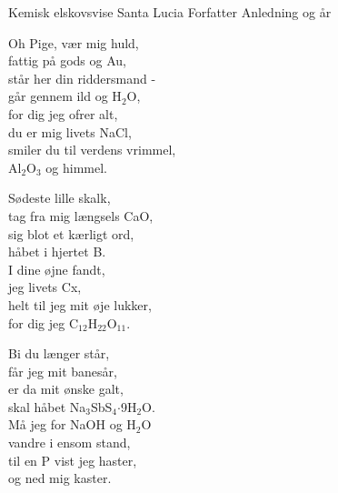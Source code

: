 \begin{song}{Kemisk elskovsvise}
  {} %
  {Santa Lucia} %
  {Forfatter} %
  {Anledning og år} %
  {\NotCCLIed} %

  \begin{SBVerse}
Oh Pige, vær mig huld,\\
fattig på gods og Au,\\
står her din riddersmand - \\
går gennem ild og H$_2$O,\\
for dig jeg ofrer alt,\\
du er mig livets NaCl,\\
smiler du til verdens vrimmel,\\
Al$_2$O$_3$ og himmel.
  \end{SBVerse}

  \begin{SBVerse}
Sødeste lille skalk,\\
tag fra mig længsels CaO,\\
sig blot et kærligt ord,\\
håbet i hjertet B.\\
I dine øjne fandt,\\
jeg livets Cx,\\
helt til jeg mit øje lukker,\\
for dig jeg C$_{12}$H$_{22}$O$_{11}$.
  \end{SBVerse}

  \begin{SBVerse}
Bi du længer står,\\
får jeg mit banesår,\\
er da mit ønske galt,\\
skal håbet Na$_3$SbS$_4$$\cdot$9H$_2$O.\\
Må jeg for NaOH og H$_2$O\\
vandre i ensom stand,\\
til en P vist jeg haster,\\
og ned mig kaster.
  \end{SBVerse}
\end{song}